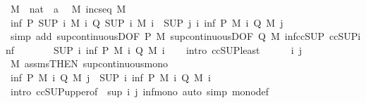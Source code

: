 \begin{isabellebody}
\ M\ {\isacharcolon}{\isacharcolon}\ {\isachardoublequoteopen}nat\ {\isasymRightarrow}\ {\isacharprime}a{\isachardoublequoteclose}\ \isamarkupfalse%
\ M{\isacharcolon}\ {\isachardoublequoteopen}incseq\ M{\isachardoublequoteclose}\isanewline
\ \ \isamarkupfalse%
\ {\isachardoublequoteopen}inf\ {\isacharparenleft}P\ {\isacharparenleft}SUP\ i{\isachardot}\ M\ i{\isacharparenright}{\isacharparenright}\ {\isacharparenleft}Q\ {\isacharparenleft}SUP\ i{\isachardot}\ M\ i{\isacharparenright}{\isacharparenright}\ {\isasymle}\ {\isacharparenleft}SUP\ j\ i{\isachardot}\ inf\ {\isacharparenleft}P\ {\isacharparenleft}M\ i{\isacharparenright}{\isacharparenright}\ {\isacharparenleft}Q\ {\isacharparenleft}M\ j{\isacharparenright}{\isacharparenright}{\isacharparenright}{\isachardoublequoteclose}\isanewline
\ \ \ \ \isamarkupfalse%
\ {\isacharparenleft}simp\ add{\isacharcolon}\ sup{\isacharunderscore}continuousD{\isacharbrackleft}OF\ P\ M{\isacharbrackright}\ sup{\isacharunderscore}continuousD{\isacharbrackleft}OF\ Q\ M{\isacharbrackright}\ inf{\isacharunderscore}ccSUP\ ccSUP{\isacharunderscore}inf{\isacharparenright}\isanewline
\ \ \isamarkupfalse%
\ \isamarkupfalse%
\ {\isachardoublequoteopen}{\isasymdots}\ {\isasymle}\ {\isacharparenleft}SUP\ i{\isachardot}\ inf\ {\isacharparenleft}P\ {\isacharparenleft}M\ i{\isacharparenright}{\isacharparenright}\ {\isacharparenleft}Q\ {\isacharparenleft}M\ i{\isacharparenright}{\isacharparenright}{\isacharparenright}{\isachardoublequoteclose}\isanewline
\ \ \isamarkupfalse%
\ {\isacharparenleft}intro\ ccSUP{\isacharunderscore}least{\isacharparenright}\isanewline
\ \ \ \ \isamarkupfalse%
\ i\ j\ \isamarkupfalse%
\ M\ assms{\isacharbrackleft}THEN\ sup{\isacharunderscore}continuous{\isacharunderscore}mono{\isacharbrackright}\ \isamarkupfalse%
\ {\isachardoublequoteopen}inf\ {\isacharparenleft}P\ {\isacharparenleft}M\ i{\isacharparenright}{\isacharparenright}\ {\isacharparenleft}Q\ {\isacharparenleft}M\ j{\isacharparenright}{\isacharparenright}\ {\isasymle}\ {\isacharparenleft}SUP\ i{\isachardot}\ inf\ {\isacharparenleft}P\ {\isacharparenleft}M\ i{\isacharparenright}{\isacharparenright}\ {\isacharparenleft}Q\ {\isacharparenleft}M\ i{\isacharparenright}{\isacharparenright}{\isacharparenright}{\isachardoublequoteclose}\isanewline
\ \ \ \ \ \ \isamarkupfalse%
\ {\isacharparenleft}intro\ ccSUP{\isacharunderscore}upper{}{\isacharbrackleft}of\ {\isacharunderscore}\ {\isachardoublequoteopen}sup\ i\ j{\isachardoublequoteclose}{\isacharbrackright}\ inf{\isacharunderscore}mono{\isacharparenright}\ {\isacharparenleft}auto\ simp{\isacharcolon}\ mono{\isacharunderscore}def{\isacharparenright}\isanewline

\end{isabellebody}

